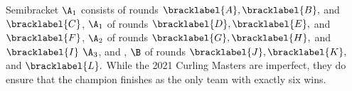 {    

    Semibracket $\A_1$ consists of rounds $\bracklabel{A}, \bracklabel{B},$ and $\bracklabel{C}$, $\A_1$ of rounds $\bracklabel{D}, \bracklabel{E},$ and $\bracklabel{F}$, $\A_2$ of rounds $\bracklabel{G}, \bracklabel{H},$ and $\bracklabel{I}$  $\A_3$, and , $\B$ of rounds $\bracklabel{J}, \bracklabel{K},$ and $\bracklabel{L}.$ While the 2021 Curling Masters are imperfect, they do ensure that the champion finishes as the only team with exactly six wins.


}
